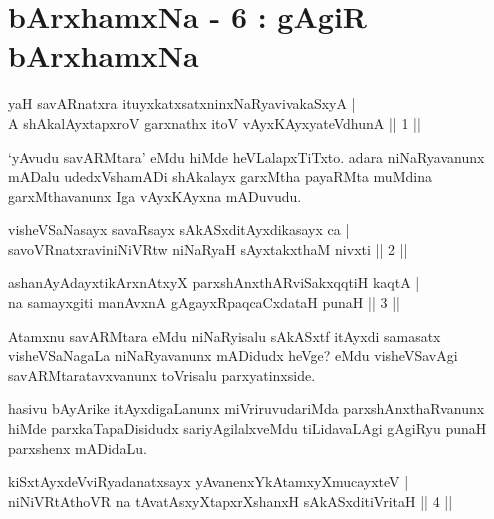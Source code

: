 
\chapter{bArxhamxNa - 6 : gAgiR bArxhamxNa}

\begin{shl}
yaH savARnatxra ituyxkatxsatxninxNaRyavivakaSxyA |\\
A shAkalAyxtapxroV garxnathx itoV vAyxKAyxyateV\s dhunA \hfill || 1 ||
\end{shl}

\begin{artha}
`yAvudu savARMtara' eMdu hiMde heVLalapxTiTxto. adara niNaRyavanunx mADalu udedxVshamADi shAkalayx garxMtha payaRMta muMdina garxMthavanunx Iga vAyxKAyxna mADuvudu.
\end{artha}

\begin{shl}
visheVSaNasayx savaRsayx sAkASxditAyxdikasayx ca |\\
savoVRnatxraviniNiVRtw niNaRyaH sAyxtakxthaM nivxti \hfill || 2 ||
\end{shl}

\begin{shl}
ashanAyAdayxtikArxnAtxyX parxshAnxthARviSakxqqtiH kaqtA |\\
na samayxgiti manAvxnA gAgayxRpaqcaCxdataH punaH \hfill || 3 ||
\end{shl}

\begin{artha}
Atamxnu savARMtara eMdu niNaRyisalu sAkASxtf itAyxdi samasatx visheVSaNagaLa niNaRyavanunx mADidudx heVge? eMdu visheVSavAgi savARMtaratavxvanunx toVrisalu parxyatinxside.

hasivu bAyArike itAyxdigaLanunx miVriruvudariMda parxshAnxthaRvanunx hiMde parxkaTapaDisidudx sariyAgilalxveMdu tiLidavaLAgi gAgiRyu punaH parxshenx mADidaLu.
\end{artha}


\begin{shl}
kiSxtAyxdeVviRyadanatxsayx yAvanenxYkAtamxyXmucayxteV |\\
niNiVRtAthoVR na tAvatAsxyXtapxrXshanxH sAkASxditiVritaH \hfill || 4 ||
\end{shl}

